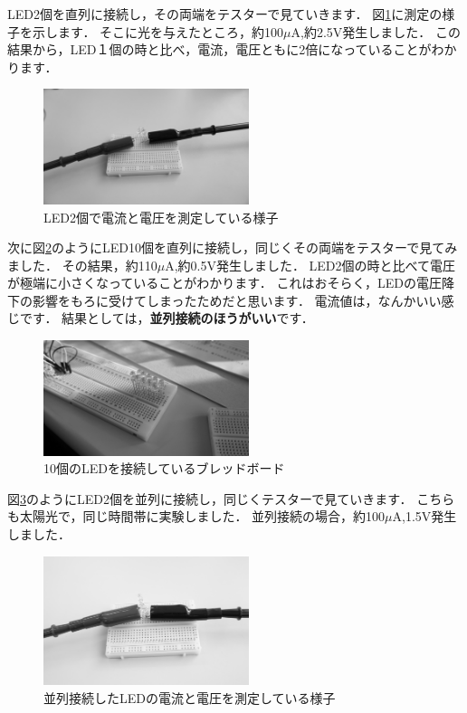 LED2個を直列に接続し，その両端をテスターで見ていきます．
図\ref{fig:led2}に測定の様子を示します．
そこに光を与えたところ，約100$\mu\si\ampere$,約2.5$\si\volt$発生しました．
この結果から，LED１個の時と比べ，電流，電圧ともに2倍になっていることがわかります．

\begin{figure}[htbp]
    \centering
    \includegraphics[width=60mm]{./assets/mouse/gray/12.JPG}
    \caption{LED2個で電流と電圧を測定している様子}
    \label{fig:led2}
\end{figure}

次に図\ref{fig:led10}のようにLED10個を直列に接続し，同じくその両端をテスターで見てみました．
その結果，約110$\mu\si\ampere$,約0.5$\si\volt$発生しました．
LED2個の時と比べて電圧が極端に小さくなっていることがわかります．
これはおそらく，LEDの電圧降下の影響をもろに受けてしまったためだと思います．
電流値は，なんかいい感じです．
結果としては，\textbf{並列接続のほうがいい}です．


\begin{figure}[htbp]
    \centering
    \includegraphics[width=60mm]{./assets/mouse/gray/4.JPG}
    \caption{10個のLEDを接続しているブレッドボード}
    \label{fig:led10}
\end{figure}

図\ref{fig:led_par}のようにLED2個を並列に接続し，同じくテスターで見ていきます．
こちらも太陽光で，同じ時間帯に実験しました．
並列接続の場合，約100$\mu\si\ampere$,1.5$\si\volt$発生しました．


\begin{figure}[htbp]
    \centering
    \includegraphics[width=60mm]{./assets/mouse/gray/13.JPG}
    \caption{並列接続したLEDの電流と電圧を測定している様子}
    \label{fig:led_par}
\end{figure}


